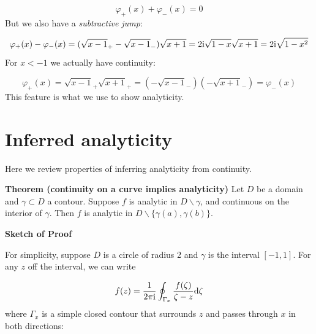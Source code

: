 \documentclass[12pt,a4paper]{article}
\def\D{ {\rm d} }
\def\I{ {\rm i} }
\begin{document}
\[
\varphi_+(x) + \varphi_-(x) = 0
\]
But we also have a \emph{subtractive jump}:

\[
\varphi_+(x) - \varphi_-(x) = (\sqrt{x-1}_+ - \sqrt{x-1}_-) \sqrt{x+1} = 2\I \sqrt{1-x}\sqrt{x+1} = 2\I \sqrt{1 - x^2}
\]
For $x < -1$ we actually have continuity:

\[
\varphi_+(x) = \sqrt{x-1}_+ \sqrt{x+1}_+ = (- \sqrt{x-1}_-)(- \sqrt{x+1}_-) = \varphi_-(x)
\]
This feature is what we use to show analyticity.

\section{Inferred analyticity}
Here we review properties of inferring analyticity from continuity.

\textbf{Theorem (continuity on a curve implies analyticity)} Let $D$ be a domain and $\gamma \subset D$ a contour.  Suppose $f$ is analytic in $D \backslash \gamma$, and continuous on the interior of $\gamma$.  Then $f$ is analytic in $D \backslash \{\gamma(a), \gamma(b) \}$.

\textbf{Sketch of Proof} 

For simplicity, suppose $D$ is a circle of radius 2 and $\gamma$ is the interval $[-1,1]$.   For any $z$ off the interval, we can write 

\[
f(z) = {1 \over 2 \pi \I} \oint_{\Gamma_x} {f(\zeta) \over  \zeta - z} \D\zeta
\]
where $\Gamma_x$ is a simple closed contour that surrounds $z$ and passes through $x$ in both directions:
\end{document}
